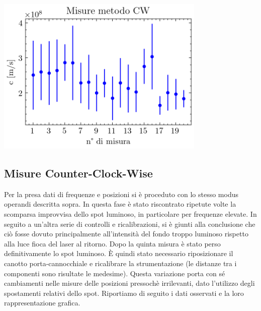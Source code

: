 \documentclass{article}
\begin{document}
\begin{minipage}{\textwidth}
\begin{minipage}[b]{0.35\textwidth}
                    \label{tabular:dati c}

                \end{minipage}
                \begin{minipage}[b]{0.65\linewidth}  

                    \centering
                    \includegraphics[width=10cm]{../images/CW.png}

                    \label{fig:c_CW}

                \end{minipage}
            
            \end{minipage}
            
            
        \subsection{Misure Counter-Clock-Wise}

            Per la presa dati di frequenze e posizioni si è proceduto con lo stesso modus operandi descritta sopra. 
            In questa fase è stato riscontrato ripetute volte la scomparsa improvvisa dello spot luminoso, in particolare per frequenze elevate. 
            In seguito a un'altra serie di controlli e ricalibrazioni, si è giunti alla conclusione che ciò fosse dovuto principalmente all'intensità del fondo 
            troppo luminoso rispetto alla luce fioca del laser al ritorno. 
            Dopo la quinta misura è stato perso definitivamente lo spot luminoso. È quindi stato necessario riposizionare il canotto porta-cannocchiale e 
            ricalibrare la strumentazione (le distanze tra i componenti sono risultate le medesime).
            Questa variazione porta con sé cambiamenti nelle misure delle posizioni pressochè irrilevanti, dato l'utilizzo degli spostamenti relativi dello spot.
            Riportiamo di seguito i dati osservati e la loro rappresentazione grafica.   
\end{document}
